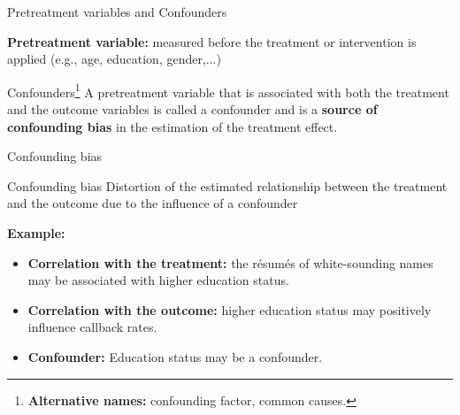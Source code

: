\documentclass[aspectratio=169]{beamer}
\begin{document}
        
    

\begin{frame}{Pretreatment variables and Confounders}

    \textbf{Pretreatment variable:} measured before the treatment or intervention is applied \textcolor{deepskyblue3}{(e.g., age, education, gender,...)}
    
    \begin{coolblock}{Confounders\footnote{\scriptsize \textbf{Alternative names:} confounding factor, common causes.}}
        A pretreatment variable that is associated with both the treatment and the outcome variables is called a confounder and is a \textbf{source of confounding bias} in the estimation of the treatment effect.
    \end{coolblock}
    
\end{frame}

\begin{frame}{Confounding bias}
    
    \begin{coolblock}{Confounding bias}
       Distortion of the estimated relationship between the treatment and the outcome due to the influence of a confounder
    \end{coolblock}

    \textbf{Example:} 
    \begin{itemize}
        \item \textbf{Correlation with the treatment:} the résumés of white-sounding names may be associated with higher education status.
        \item \textbf{Correlation with the outcome:} higher education status may positively influence callback rates.
        \item \textbf{Confounder:} Education status may be a confounder.
    \end{itemize}

    
\end{frame}
\end{document}
